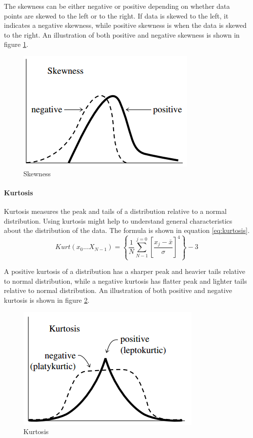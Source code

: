 \documentclass[USenglish]{ifimaster}  %
\begin{document}
The skewness can be either negative or positive depending on whether data points are skewed to the left or to the right. If data is skewed to the left, it indicates a negative skewness, while positive skewness is when the data is skewed to the right. An illustration of both positive and negative skewness is shown in figure \ref{fig:skew}.
	
	\begin{figure}[h]
		\centering
		\includegraphics[scale=0.8]{Figures/Skewness}
		\caption{Skewness \cite{Press:2007:NRE:1403886}}
		\label{fig:skew}
	\end{figure}
	
	\FloatBarrier
	
\paragraph{Kurtosis}
Kurtosis measures the peak and tails of a distribution relative to a normal distribution. Using kurtosis might help to understand general characteristics about the distribution of the data. The formula is shown in equation \ref{eq:kurtosis}\cite{Press:2007:NRE:1403886}.
	\begin{equation}
	Kurt(x_0\dotsc X_{N-1}) = \left \{ \frac{1}{N}\sum_{N-1}^{j=0}\left [ \frac{x_j-\bar{x}}{\sigma} \right ]^4 \right \}-3
	\label{eq:kurtosis}
	\end{equation}
	
A positive kurtosis of a distribution has a sharper peak and heavier tails relative to normal distribution, while a negative kurtosis has flatter peak and lighter tails relative to normal distribution. An illustration of both positive and negative kurtosis is shown in figure \ref{fig:kurtosis}.
	
	\begin{figure}[h]
		\centering
		\includegraphics[scale=0.8]{Figures/Kurtosis}
		\caption{Kurtosis \cite{Press:2007:NRE:1403886}}
		\label{fig:kurtosis}
	\end{figure}
	
\end{document}
